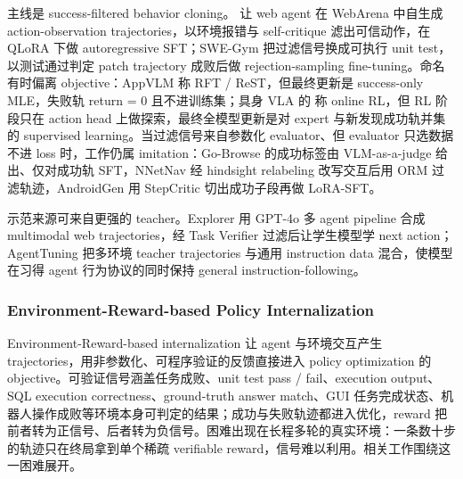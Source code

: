 主线是 success-filtered behavior cloning。\cite{Pat24} 让 web agent 在 WebArena 中自生成 action-observation trajectories，以环境报错与 self-critique 滤出可信动作，在 QLoRA 下做 autoregressive SFT；SWE-Gym \cite{Pan24} 把过滤信号换成可执行 unit test，以测试通过判定 patch trajectory 成败后做 rejection-sampling fine-tuning。命名有时偏离 objective：AppVLM \cite{Pap25b} 称 RFT / ReST，但最终更新是 success-only MLE，失败轨 return = 0 且不进训练集；具身 VLA 的 \cite{Guo25d} 称 online RL，但 RL 阶段只在 action head 上做探索，最终全模型更新是对 expert 与新发现成功轨并集的 supervised learning。当过滤信号来自参数化 evaluator、但 evaluator 只选数据不进 loss 时，工作仍属 imitation：Go-Browse \cite{Gan25b} 的成功标签由 VLM-as-a-judge 给出、仅对成功轨 SFT，NNetNav \cite{Mur24b} 经 hindsight relabeling 改写交互后用 ORM 过滤轨迹，AndroidGen \cite{Lai25d} 用 StepCritic 切出成功子段再做 LoRA-SFT。

示范来源可来自更强的 teacher。Explorer \cite{Pah25} 用 GPT-4o 多 agent pipeline 合成 multimodal web trajectories，经 Task Verifier 过滤后让学生模型学 next action；AgentTuning \cite{Zen23d} 把多环境 teacher trajectories 与通用 instruction data 混合，使模型在习得 agent 行为协议的同时保持 general instruction-following。

\subsubsection{Environment-Reward-based Policy Internalization}

Environment-Reward-based internalization 让 agent 与环境交互产生 trajectories，用非参数化、可程序验证的反馈直接进入 policy optimization 的 objective。可验证信号涵盖任务成败、unit test pass / fail、execution output、SQL execution correctness、ground-truth answer match、GUI 任务完成状态、机器人操作成败等环境本身可判定的结果；成功与失败轨迹都进入优化，reward 把前者转为正信号、后者转为负信号。困难出现在长程多轮的真实环境：一条数十步的轨迹只在终局拿到单个稀疏 verifiable reward，信号难以利用。相关工作围绕这一困难展开。


